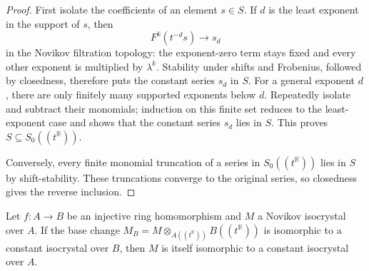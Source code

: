 \begin{proof}
  \leanok
  First isolate the coefficients of an element $s\in S$.  If $d$ is the least
  exponent in the support of $s$, then
  \[
    F^k(t^{-d}s)\longrightarrow s_d
  \]
  in the Novikov filtration topology: the exponent-zero term stays fixed and
  every other exponent is multiplied by $\lambda^k$.  Stability under shifts
  and Frobenius, followed by closedness, therefore puts the constant series
  $s_d$ in $S$.  For a general exponent $d$, there are only finitely many
  supported exponents below $d$.  Repeatedly isolate and subtract their
  monomials; induction on this finite set reduces to the least-exponent case
  and shows that the constant series $s_d$ lies in $S$.  This proves
  $S\subseteq S_0((t^{\mathbb{R}}))$.

  Conversely, every finite monomial truncation of a series in
  $S_0((t^{\mathbb{R}}))$ lies in $S$ by shift-stability.  These truncations
  converge to the original series, so closedness gives the reverse inclusion.
\end{proof}

\begin{theorem}
  \label{prop:nov_isoc_injective}
  \leanok
  Let $f \colon A \to B$ be an injective ring homomorphism and $M$ a Novikov
  isocrystal over $A$.  If the base change
  $M_B=M\otimes_{A((t^{\mathbb{R}}))}B((t^{\mathbb{R}}))$ is isomorphic to a
  constant isocrystal over $B$, then $M$ is itself isomorphic to a constant isocrystal over $A$.
\end{theorem}

